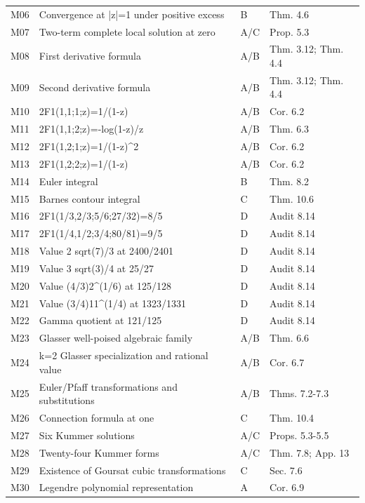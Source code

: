 \begin{longtable}{@{}p{}p{}p{}p{}@{}}
M06 & Convergence at |z|=1 under positive excess & \textsf{B} & Thm. 4.6 \\
M07 & Two-term complete local solution at zero & \textsf{A/C} & Prop. 5.3 \\
M08 & First derivative formula & \textsf{A/B} & Thm. 3.12; Thm. 4.4 \\
M09 & Second derivative formula & \textsf{A/B} & Thm. 3.12; Thm. 4.4 \\
M10 & 2F1(1,1;1;z)=1/(1-z) & \textsf{A/B} & Cor. 6.2 \\
M11 & 2F1(1,1;2;z)=-log(1-z)/z & \textsf{A/B} & Thm. 6.3 \\
M12 & 2F1(1,2;1;z)=1/(1-z)\textasciicircum{}2 & \textsf{A/B} & Cor. 6.2 \\
M13 & 2F1(1,2;2;z)=1/(1-z) & \textsf{A/B} & Cor. 6.2 \\
M14 & Euler integral & \textsf{B} & Thm. 8.2 \\
M15 & Barnes contour integral & \textsf{C} & Thm. 10.6 \\
M16 & 2F1(1/3,2/3;5/6;27/32)=8/5 & \textsf{D} & Audit 8.14 \\
M17 & 2F1(1/4,1/2;3/4;80/81)=9/5 & \textsf{D} & Audit 8.14 \\
M18 & Value 2 sqrt(7)/3 at 2400/2401 & \textsf{D} & Audit 8.14 \\
M19 & Value 3 sqrt(3)/4 at 25/27 & \textsf{D} & Audit 8.14 \\
M20 & Value (4/3)2\textasciicircum{}(1/6) at 125/128 & \textsf{D} & Audit 8.14 \\
M21 & Value (3/4)11\textasciicircum{}(1/4) at 1323/1331 & \textsf{D} & Audit 8.14 \\
M22 & Gamma quotient at 121/125 & \textsf{D} & Audit 8.14 \\
M23 & Glasser well-poised algebraic family & \textsf{A/B} & Thm. 6.6 \\
M24 & k=2 Glasser specialization and rational value & \textsf{A/B} & Cor. 6.7 \\
M25 & Euler/Pfaff transformations and substitutions & \textsf{A/B} & Thms. 7.2-7.3 \\
M26 & Connection formula at one & \textsf{C} & Thm. 10.4 \\
M27 & Six Kummer solutions & \textsf{A/C} & Props. 5.3-5.5 \\
M28 & Twenty-four Kummer forms & \textsf{A/C} & Thm. 7.8; App. 13 \\
M29 & Existence of Goursat cubic transformations & \textsf{C} & Sec. 7.6 \\
M30 & Legendre polynomial representation & \textsf{A} & Cor. 6.9 \\

\end{longtable}

